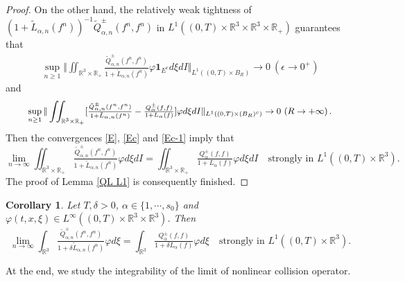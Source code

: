 \documentclass[reqno,11pt]{amsart}
\newtheorem{corollary}{Corollary}[section]
\numberwithin{equation}{section}
\def\R{\mathbb{R}}
\begin{document}
\begin{proof}
On the other hand, the relatively weak tightness of $(1+ \tilde{L}_{\alpha,n}(f^n))^{-1}\tilde{Q}^\pm _{\alpha,n}(f^n,f^n)$ in $L^1((0,T)\times \R^3 \times \R^3 \times \R_+)$ guarantees that
	\begin{equation}\label{Ec}
		\begin{aligned}
			\sup \limits_{n\geq 1} \Vert \iint_{ \R^3 \times \R_+} \tfrac{\tilde{Q}^\pm _{\alpha,n}(f^n,f^n)}{1+ \tilde{L}_{\alpha,n}(f^n)}\varphi \mathbf{1}_{E^c} d\xi dI \Vert_{L^1((0,T)\times B_R)} \rightarrow 0 \ (\epsilon \rightarrow 0^+)
		\end{aligned}
	\end{equation}
and 
\begin{equation}\label{Ec-1}{\small
  \begin{aligned}
    \sup_{n \geq 1} \| \iint_{ \R^3 \times \R_+} [ \tfrac{\tilde{Q}^\pm _{\alpha,n}(f^n,f^n)}{1+ \tilde{L}_{\alpha,n}(f^n)} - \tfrac{Q^\pm _{\alpha}(f,f)}{1+L_{\alpha}(f)} ] \varphi d\xi dI \|_{L^1 ( (0, T) \times ( B_R  )^c )} \to 0 \ (R \to + \infty) \,.
  \end{aligned}}
\end{equation}
Then the convergences \eqref{E}, \eqref{Ec} and \eqref{Ec-1} imply that
	\begin{equation}
	\lim \limits_{n\rightarrow \infty} \iint_{ \R^3 \times \R_+} \tfrac{\tilde{Q}^\pm _{\alpha,n}(f^n,f^n)}{1+ \tilde{L}_{\alpha,n}(f^n)}\varphi d\xi dI = \iint_{ \R^3 \times \R_+} \tfrac{Q^\pm _{\alpha}(f,f)}{1+ L_{\alpha}(f)}\varphi d\xi dI \quad \text{strongly in } L^1((0,T) \times \R^3).
\end{equation}
The proof of Lemma \ref{QL L1} is consequently finished.
\end{proof}

\begin{corollary}\label{corQLL1}
	Let $T, \delta > 0$, $\alpha \in \{1,\cdots,s_0\}$ and $\varphi (t, x, \xi) \in L^\infty ((0,T)\times \R^3\times \R^3 )$. Then
	\begin{equation*}
		\lim \limits_{n\rightarrow \infty} \int_{ \R^3 } \tfrac{\tilde{Q}^\pm _{\alpha,n}(f^n,f^n)}{1+\delta \tilde{L}_{\alpha,n}(f^n)}\varphi d\xi  = \int_{ \R^3} \tfrac{Q^\pm _{\alpha}(f,f)}{1+\delta L_{\alpha}(f)}\varphi d\xi \quad \text{strongly in } L^1((0,T)\times \R^3).
	\end{equation*}
\end{corollary}

At the end, we study the integrability of the limit of nonlinear collision operator.
\end{document}
